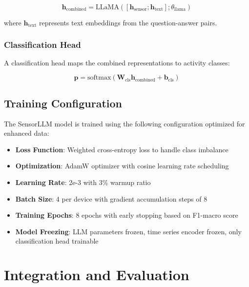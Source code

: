 \begin{equation}
\mathbf{h}_{\text{combined}} = \text{LLaMA}([\mathbf{h}_{\text{sensor}}; \mathbf{h}_{\text{text}}]; \theta_{\text{llama}})
\end{equation}

where $\mathbf{h}_{\text{text}}$ represents text embeddings from the question-answer pairs.

\subsubsection{Classification Head}

\hspace{2em}A classification head maps the combined representations to activity classes:

\begin{equation}
\mathbf{p} = \text{softmax}(\mathbf{W}_{\text{cls}} \mathbf{h}_{\text{combined}} + \mathbf{b}_{\text{cls}})
\end{equation}

\subsection{Training Configuration}

\hspace{2em}The SensorLLM model is trained using the following configuration optimized for enhanced data:

\begin{itemize}
    \item \textbf{Loss Function}: Weighted cross-entropy loss to handle class imbalance
    \item \textbf{Optimization}: AdamW optimizer with cosine learning rate scheduling
    \item \textbf{Learning Rate}: 2e-3 with 3\% warmup ratio
    \item \textbf{Batch Size}: 4 per device with gradient accumulation steps of 8
    \item \textbf{Training Epochs}: 8 epochs with early stopping based on F1-macro score
    \item \textbf{Model Freezing}: LLM parameters frozen, time series encoder frozen, only classification head trainable
\end{itemize}

\section{Integration and Evaluation}


